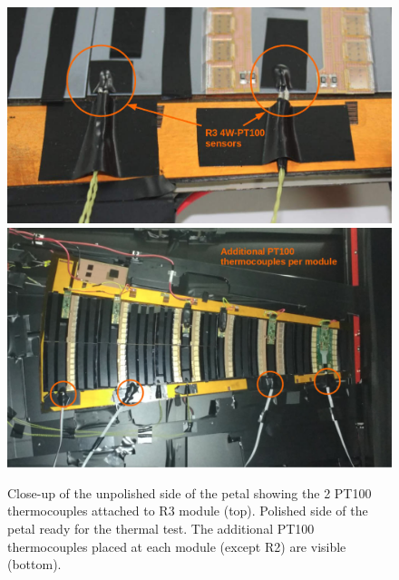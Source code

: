 		\begin{figure}[H]
			\centering
			\captionsetup{justification=centering,margin=2cm}
			\includegraphics[scale=0.47]{Figures/Chapter02/R3PT100CloseUp.jpg}
			\includegraphics[scale=0.45]{Figures/Chapter02/AdditionalPT100perModule.jpg}
			\caption{Close-up of the unpolished side of the petal showing the 2 PT100 thermocouples attached to R3 module (top). Polished side of the petal ready for the thermal test. The additional PT100 thermocouples placed at each module (except R2) are visible (bottom).}\label{fig2.9}
		\end{figure}
